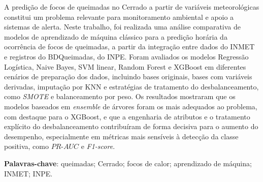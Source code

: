 \begin{resumo}
A predição de focos de queimadas no Cerrado a partir de variáveis meteorológicas constitui um problema relevante para monitoramento ambiental e apoio a sistemas de alerta. Neste trabalho, foi realizada uma análise comparativa de modelos de aprendizado de máquina clássico para a predição horária da ocorrência de focos de queimadas, a partir da integração entre dados do INMET e registros do BDQueimadas, do INPE. Foram avaliados os modelos Regressão Logística, Naive Bayes, SVM linear, Random Forest e XGBoost em diferentes cenários de preparação dos dados, incluindo bases originais, bases com variáveis derivadas, imputação por KNN e estratégias de tratamento do desbalanceamento, como \textit{SMOTE} e balanceamento por peso. Os resultados mostraram que os modelos baseados em \textit{ensemble} de árvores foram os mais adequados ao problema, com destaque para o XGBoost, e que a engenharia de atributos e o tratamento explícito do desbalanceamento contribuíram de forma decisiva para o aumento do desempenho, especialmente em métricas mais sensíveis à detecção da classe positiva, como $PR\text{-}AUC$ e \textit{F1-score}.
\medskip

\textbf{Palavras-chave}: queimadas; Cerrado; focos de calor; aprendizado de máquina; INMET; INPE.
\end{resumo}
